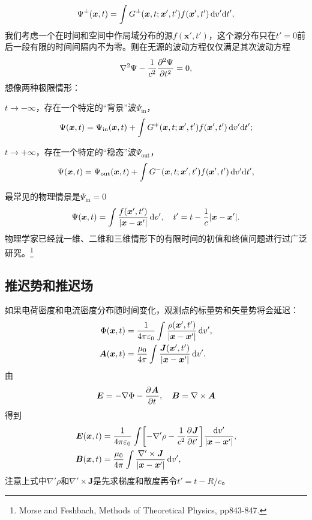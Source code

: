 \[
    \Psi^\pm(\bm x,t)=\int G^\pm(\bm x,t;\bm x',t')f(\bm x',t')\d v'\nd t',
\]
我们考虑一个在时间和空间中作局域分布的源$f(\bm x',t')$，这个源分布只在$t'=0$前后一段有限的时间间隔内不为零。则在无源的波动方程仅仅满足其次波动方程
\[
    \lapla\Psi-\frac1{c^2}\pv[2]\Psi t=0,
\]
想像两种极限情形：
\begin{compactenum}
	\item $t\to-\infty$，存在一个特定的“背景”波$\Psi_\text{in}$，
	\[
        \Psi(\bm x,t)=\Psi_\text{in}(\bm x,t)+\int G^+(\bm x,t;\bm x',t')f(\bm x',t')\d v'\nd t';
    \]
	\item $t\to+\infty$，存在一个特定的“稳态”波$\Psi_\text{out}$，
	\[
        \Psi(\bm x,t)=\Psi_\text{out}(\bm x,t)+\int G^-(\bm x,t;\bm x',t')f(\bm x',t')\d v'\nd t',
    \]
\end{compactenum}
最常见的物理情景是$\Psi_\text{in}=0$%
\begin{equation}
    \Psi(\bm x,t)=\int\frac{f(\bm x',t')}{|\bm x-\bm x'|}\d v',\quad t'=t-\frac1c|\bm x-\bm x'|.
\end{equation}
物理学家已经就一维、二维和三维情形下的有限时间的初值和终值问题进行过广泛研究。\footnote{Morse and Feshbach, Methods of Theoretical Physics, pp843-847.}
\subsection{推迟势和推迟场}
如果电荷密度和电流密度分布随时间变化，观测点的标量势和矢量势将会延迟：
\begin{align}
    \Phi(\bm x,t)&=\frac1{4\pi\varepsilon_0}\int\frac{\rho(\bm x',t')}{|\bm x-\bm x'|}\d v',\\
    \bm A(\bm x,t)&=\frac{\mu_0}{4\pi}\int\frac{\bm J(\bm x',t')}{|\bm x-\bm x'|}\d v'.
\end{align}
由
\[
    \bm E=-\nabla\Phi-\pv{\bm A}t,\quad\bm B=\curl\bm A
\]
得到
\begin{align}
    \bm E(\bm x,t)&=\frac1{4\pi\varepsilon_0}\int\biggfkh{-\nabla'\rho-\frac1{c^2}\pv{\bm J}{t'}}\frac{\d v'}{|\bm x-\bm x'|},\\
    \bm B(\bm x,t)&=\frac{\mu_0}{4\pi}\int\frac{\nabla'\times\bm J}{|\bm x-\bm x'|}\d v',
\end{align}
注意上式中$\nabla'\rho$和$\nabla'\times\bm J$是先求梯度和散度再令$t'=t-R/c$。

